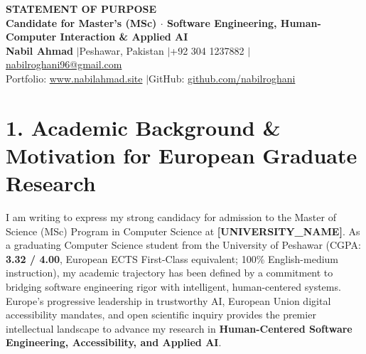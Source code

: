 \documentclass[10pt,a4paper]{article}
\begin{document}
\pagestyle{empty}

\begin{center}
    {\large \textbf{STATEMENT OF PURPOSE}} \\[2pt]
    \textbf{Candidate for Master’s (MSc) $\cdot$ Software Engineering, Human-Computer Interaction \& Applied AI} \\[2pt]
    \small \textbf{Nabil Ahmad} \quad$|$\quad Peshawar, Pakistan \quad$|$\quad +92 304 1237882 \quad$|$\quad \href{mailto:nabilroghani96@gmail.com}{nabilroghani96@gmail.com} \\[1pt]
    Portfolio: \href{https://www.nabilahmad.site}{www.nabilahmad.site} \quad$|$\quad GitHub: \href{https://github.com/nabilroghani}{github.com/nabilroghani}
\end{center}
\vspace{-4pt}

\section{1. Academic Background \& Motivation for European Graduate Research}
I am writing to express my strong candidacy for admission to the Master of Science (MSc) Program in Computer Science at \textbf{[UNIVERSITY\_NAME]}. As a graduating Computer Science student from the University of Peshawar (CGPA: \textbf{3.32 / 4.00}, European ECTS First-Class equivalent; 100\% English-medium instruction), my academic trajectory has been defined by a commitment to bridging software engineering rigor with intelligent, human-centered systems. Europe’s progressive leadership in trustworthy AI, European Union digital accessibility mandates, and open scientific inquiry provides the premier intellectual landscape to advance my research in \textbf{Human-Centered Software Engineering, Accessibility, and Applied AI}.

\end{document}
